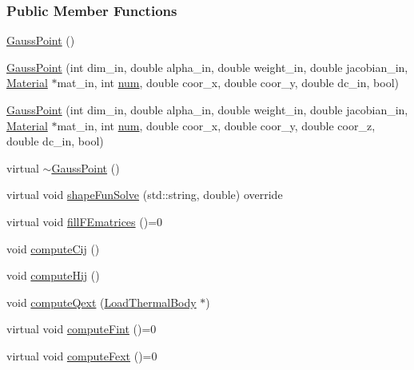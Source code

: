 \subsubsection*{Public Member Functions}
\begin{DoxyCompactItemize}
\item 
\hyperlink{classmknix_1_1_gauss_point_a1d7606bf5762dabe86b0c5c83f2f1de2}{Gauss\+Point} ()
\item 
\hyperlink{classmknix_1_1_gauss_point_a7daa2ac74ca556b37e08bd17acf98722}{Gauss\+Point} (int dim\+\_\+in, double alpha\+\_\+in, double weight\+\_\+in, double jacobian\+\_\+in, \hyperlink{classmknix_1_1_material}{Material} $\ast$mat\+\_\+in, int \hyperlink{classmknix_1_1_gauss_point_a47cb3d74f927e150168f2052553cbea8}{num}, double coor\+\_\+x, double coor\+\_\+y, double dc\+\_\+in, bool)
\item 
\hyperlink{classmknix_1_1_gauss_point_a16d2f213eb613c133a7ba8a76e8230b7}{Gauss\+Point} (int dim\+\_\+in, double alpha\+\_\+in, double weight\+\_\+in, double jacobian\+\_\+in, \hyperlink{classmknix_1_1_material}{Material} $\ast$mat\+\_\+in, int \hyperlink{classmknix_1_1_gauss_point_a47cb3d74f927e150168f2052553cbea8}{num}, double coor\+\_\+x, double coor\+\_\+y, double coor\+\_\+z, double dc\+\_\+in, bool)
\item 
virtual \hyperlink{classmknix_1_1_gauss_point_a84a09a5e3fa0bf13b6c1d710a838f883}{$\sim$\+Gauss\+Point} ()
\item 
virtual void \hyperlink{classmknix_1_1_gauss_point_a0428636dc89cb81d7143107872ec0923}{shape\+Fun\+Solve} (std\+::string, double) override
\item 
virtual void \hyperlink{classmknix_1_1_gauss_point_abe9b6747adc3c7d58e784d488482ec9d}{fill\+F\+Ematrices} ()=0
\item 
void \hyperlink{classmknix_1_1_gauss_point_ab82f09f4b4f9ae25f78551e1aa2e4ee6}{compute\+Cij} ()
\item 
void \hyperlink{classmknix_1_1_gauss_point_a92a5358c2a4305b15d33d265e4603621}{compute\+Hij} ()
\item 
void \hyperlink{classmknix_1_1_gauss_point_a7e569626121f05e4bf0472f634267d3f}{compute\+Qext} (\hyperlink{classmknix_1_1_load_thermal_body}{Load\+Thermal\+Body} $\ast$)
\item 
virtual void \hyperlink{classmknix_1_1_gauss_point_aca9ef8afd31139f362bc49ea18cbcdb9}{compute\+Fint} ()=0
\item 
virtual void \hyperlink{classmknix_1_1_gauss_point_a01f8bdcd2e4e44e1c1508b9a9e49779c}{compute\+Fext} ()=0
\item 

\end{DoxyCompactItemize}
